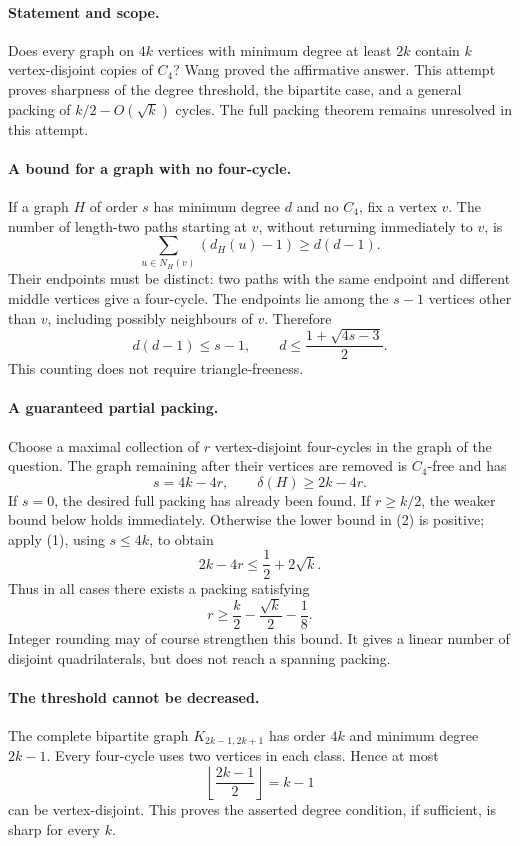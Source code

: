 \paragraph{Statement and scope.}
Does every graph on \(4k\) vertices with minimum degree at least \(2k\) contain \(k\) vertex-disjoint copies of \(C_4\)? Wang proved the affirmative answer. This attempt proves sharpness of the degree threshold, the bipartite case, and a general packing of \(k/2-O(\sqrt k)\) cycles. The full packing theorem remains unresolved in this attempt.

\paragraph{A bound for a graph with no four-cycle.}
If a graph \(H\) of order \(s\) has minimum degree \(d\) and no \(C_4\), fix a vertex \(v\). The number of length-two paths starting at \(v\), without returning immediately to \(v\), is
\[
 \sum_{u\in N_H(v)}(d_H(u)-1)\geq d(d-1).
\]
Their endpoints must be distinct: two paths with the same endpoint and different middle vertices give a four-cycle. The endpoints lie among the \(s-1\) vertices other than \(v\), including possibly neighbours of \(v\). Therefore
\[
 d(d-1)\leq s-1,
 \qquad d\leq\frac{1+\sqrt{4s-3}}2. \tag{1}
\]
This counting does not require triangle-freeness.

\paragraph{A guaranteed partial packing.}
Choose a maximal collection of \(r\) vertex-disjoint four-cycles in the graph of the question. The graph remaining after their vertices are removed is \(C_4\)-free and has
\[
 s=4k-4r,\qquad \delta(H)\geq2k-4r. \tag{2}
\]
If \(s=0\), the desired full packing has already been found. If \(r\geq k/2\), the weaker bound below holds immediately. Otherwise the lower bound in (2) is positive; apply (1), using \(s\leq4k\), to obtain
\[
 2k-4r\leq\frac12+2\sqrt k.
\]
Thus in all cases there exists a packing satisfying
\[
 r\geq\frac k2-\frac{\sqrt k}{2}-\frac18. \tag{3}
\]
Integer rounding may of course strengthen this bound. It gives a linear number of disjoint quadrilaterals, but does not reach a spanning packing.

\paragraph{The threshold cannot be decreased.}
The complete bipartite graph \(K_{2k-1,2k+1}\) has order \(4k\) and minimum degree \(2k-1\). Every four-cycle uses two vertices in each class. Hence at most
\[
 \left\lfloor\frac{2k-1}{2}\right\rfloor=k-1
\]
can be vertex-disjoint. This proves the asserted degree condition, if sufficient, is sharp for every \(k\).

